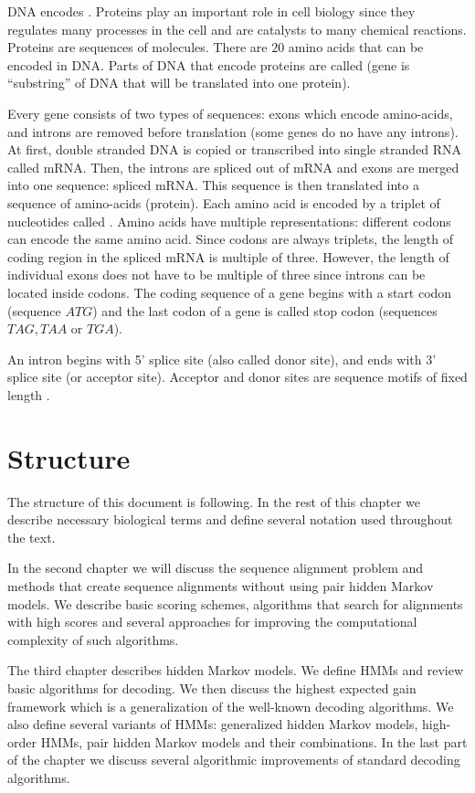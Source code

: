 DNA encodes . Proteins play an important role in cell
biology since  they regulates many processes in the cell and are catalysts to
many chemical reactions. Proteins are sequences of 
molecules. There are $20$ amino acids that can be encoded in DNA. Parts of DNA
that encode proteins are called  (gene is ``substring'' of DNA
that will be translated into one protein).

Every gene consists of two types of sequences: exons which encode amino-acids,
and introns are removed before translation (some genes do no have any introns).
At first, double stranded DNA is copied or transcribed into single stranded RNA
called mRNA. Then, the introns are spliced out of mRNA and exons are merged into
one sequence: spliced mRNA. This sequence is then translated into a sequence of
amino-acids (protein). Each amino acid is encoded by a triplet of nucleotides
called . Amino acids have multiple representations: different
codons can encode the same amino acid. Since codons are always triplets, the
length of coding region in the  spliced mRNA is multiple of three. However, the
length of individual exons does not have to be multiple of three since introns
can be located inside codons.  The coding sequence of a gene begins with a start
codon (sequence $ATG$) and the last codon of a gene is called stop codon
(sequences $TAG,TAA$ or $TGA$).

An intron begins with 5' splice site (also called donor site),  and ends with 3'
splice site (or acceptor site).  Acceptor and donor sites are sequence motifs of
fixed length \cite{Pairagon2009,UnderstandingBioinformatics}.

\section{Structure}

The structure of this document is following. In the rest of this chapter we
describe necessary biological terms and define several notation used throughout
the text.

In the second chapter we will discuss the sequence alignment problem and methods
that create sequence alignments without using pair hidden Markov models. We
describe basic scoring schemes, algorithms that search for alignments with high
scores and several approaches for improving the computational complexity of such
algorithms.

The third chapter describes hidden Markov models. We define HMMs and review
basic algorithms for decoding. We then discuss the highest expected gain
framework which is a generalization of the well-known decoding algorithms.  We
also define several variants of HMMs: generalized hidden Markov models,
high-order HMMs, pair hidden Markov models and their combinations. In the last
part of the chapter we discuss several algorithmic improvements of standard
decoding algorithms.

